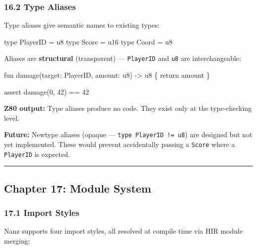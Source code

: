 \documentclass[
  11pt,
]{article}
\newenvironment{Shaded}{\begin{snugshade}}{\end{snugshade}}
\newcommand{\NormalTok}[1]{#1}
\begin{document}
\hypertarget{type-aliases}{%
\subsubsection{16.2 Type Aliases}\label{type-aliases}}

Type aliases give semantic names to existing types:

\begin{Shaded}
\begin{Highlighting}[]
\NormalTok{type PlayerID = u8}
\NormalTok{type Score = u16}
\NormalTok{type Coord = u8}
\end{Highlighting}
\end{Shaded}

Aliases are \textbf{structural} (transparent) --- \texttt{PlayerID} and
\texttt{u8} are interchangeable:

\begin{Shaded}
\begin{Highlighting}[]
\NormalTok{fun damage(target: PlayerID, amount: u8) {-}\textgreater{} u8 \{}
\NormalTok{    return amount}
\NormalTok{\}}

\NormalTok{assert damage(0, 42) == 42}
\end{Highlighting}
\end{Shaded}

\textbf{Z80 output:} Type aliases produce no code. They exist only at
the type-checking level.

\textbf{Future:} Newtype aliases (opaque ---
\texttt{type\ PlayerID\ !=\ u8}) are designed but not yet implemented.
These would prevent accidentally passing a \texttt{Score} where a
\texttt{PlayerID} is expected.

\begin{center}\rule{0.5\linewidth}{0.5pt}\end{center}

\hypertarget{chapter-17-module-system}{%
\subsection{Chapter 17: Module System}\label{chapter-17-module-system}}

\hypertarget{import-styles}{%
\subsubsection{17.1 Import Styles}\label{import-styles}}

Nanz supports four import styles, all resolved at compile time via HIR
module merging:
\end{document}
